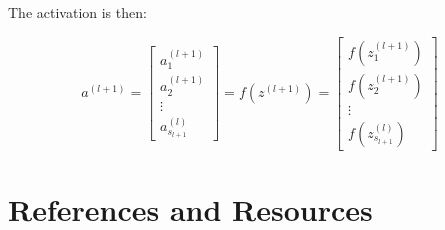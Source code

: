 \documentclass[
  letterpaper,
  DIV=11,
  numbers=noendperiod]{scrartcl}
\begin{document}
The activation is then:

\[
a^{(l+1)}=
\begin{bmatrix}
a_1^{(l+1)}\\
a_2^{(l+1)}\\
\vdots\\
a_{s_{l+1}}^{(l)}
\end{bmatrix}=f(z^{(l+1)})=\begin{bmatrix}
f(z_1^{(l+1)})\\
f(z_2^{(l+1)})\\
\vdots\\
f(z_{s_{l+1}}^{(l)})
\end{bmatrix}
\]

\hypertarget{references-and-resources}{%
\section{References and Resources}\label{references-and-resources}}
\end{document}
